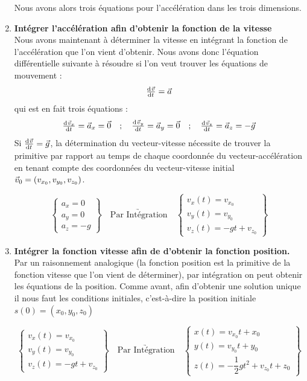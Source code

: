 \documentclass[11pt,a4paper]{article}
\begin{document}
\begin{enumerate}
    Nous avons alors trois équations pour l'accélération dans les trois dimensions. 
    \item \textbf{Intégrer l'accélération afin d'obtenir la fonction de la vitesse}\\
    Nous avons maintenant à déterminer la vitesse en intégrant la fonction de l'accélération que l'on vient d'obtenir. Nous avons donc l’équation différentielle suivante à résoudre si l’on veut trouver les équations de mouvement : 
    \[ \od{\vv}{t} = \va   \]
    qui est en fait trois équations : 
    \[ \od{\vv_x}{t} = \va_x = \Vec{0} \quad ; \quad \od{\vv_y}{t} = \va_y = \Vec{0}\quad ; \quad \od{\vv_z}{t} = \va_z = -\Vec{g}  \]
    Si  $\od{\vv}{t} = \Vec{g}$, la détermination du vecteur-vitesse nécessite de trouver la primitive par rapport au temps de chaque coordonnée du vecteur-accélération en tenant compte des coordonnées du vecteur-vitesse initial $\vec{v}_0 = (v_{x_0},v_{y_0},v_{z_0})$.
    
    \[\begin{Bmatrix} a_x = 0\\ a_y =0\\ a_z =-g\end{Bmatrix} \underrightarrow{\quad \text{Par Intégration}\quad }  \begin{Bmatrix} v_x(t) = v_{x_0}\\ v_y(t)=v_{y_0}\\ v_z(t)=-gt + v_{z_0} \end{Bmatrix}\]
    

    \item \textbf{Intégrer la fonction vitesse afin de d'obtenir la fonction position.}\\
    Par un raisonnement analogique (la fonction position est la primitive de la fonction vitesse que l'on vient de déterminer), par intégration on peut obtenir les équations de la position. Comme avant, afin d'obtenir une solution unique il nous faut les conditions initiales, c'est-à-dire la position initiale $s(0) = (x_0, y_0, z_0)$
    
        \[\begin{Bmatrix} v_x(t) = v_{x_0}\\ v_y(t)=v_{y_0}\\ v_z(t)=-gt + v_{z_0} \end{Bmatrix} \underrightarrow{\quad \text{Par Intégration}\quad }  \begin{Bmatrix} x(t) = v_{x_0}t+x_0\\ y(t)=v_{y_0}t+y_0\\ z(t)=-\dfrac{1}{2}gt^2 + v_{z_0}t + z_0 \end{Bmatrix}\]
        

\end{enumerate}
\end{document}

